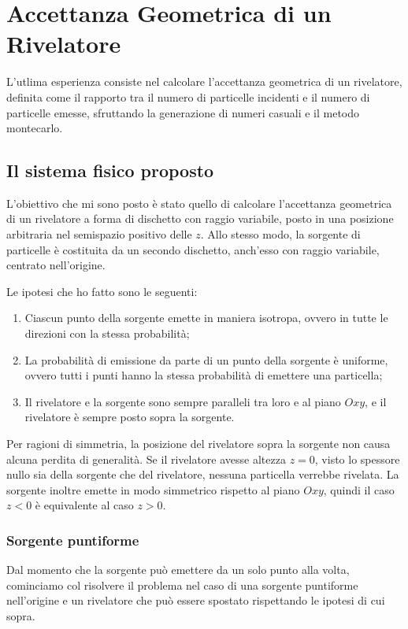 \chapter{Accettanza Geometrica di un Rivelatore}\label{ch:acc}
    L'utlima esperienza consiste nel calcolare l'accettanza geometrica di un rivelatore, definita come il rapporto tra il numero di particelle incidenti e il numero di particelle emesse, sfruttando la generazione di numeri casuali e il metodo montecarlo.

    \section{Il sistema fisico proposto}
        L'obiettivo che mi sono posto è stato quello di calcolare l'accettanza geometrica di un rivelatore a forma di dischetto con raggio variabile, posto in una posizione arbitraria nel semispazio positivo delle $z$. Allo stesso modo, la sorgente di particelle è costituita da un secondo dischetto, anch'esso con raggio variabile, centrato nell'origine.

        Le ipotesi che ho fatto sono le seguenti:
        \begin{enumerate}
            \item Ciascun punto della sorgente emette in maniera isotropa, ovvero in tutte le direzioni con la stessa probabilità;
            \item La probabilità di emissione da parte di un punto della sorgente è uniforme, ovvero tutti i punti hanno la stessa probabilità di emettere una particella;
            \item Il rivelatore e la sorgente sono sempre paralleli tra loro e al piano $Oxy$, e il rivelatore è sempre posto sopra la sorgente.
        \end{enumerate}

        Per ragioni di simmetria, la posizione del rivelatore sopra la sorgente non causa alcuna perdita di generalità. Se il rivelatore avesse altezza $z=0$, visto lo spessore nullo sia della sorgente che del rivelatore, nessuna particella verrebbe rivelata. La sorgente inoltre emette in modo simmetrico rispetto al piano $Oxy$, quindi il caso $z<0$ è equivalente al caso $z>0$.

        \subsection{Sorgente puntiforme}
            Dal momento che la sorgente può emettere da un solo punto alla volta, cominciamo col risolvere il problema nel caso di una sorgente puntiforme nell'origine e un rivelatore che può essere spostato rispettando le ipotesi di cui sopra. 
            
